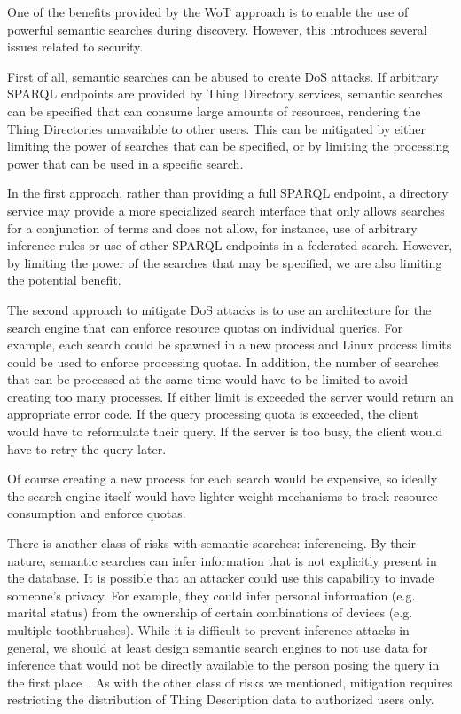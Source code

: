 One of the benefits provided by the WoT approach is to
enable the use of powerful semantic searches during discovery.
However, this introduces several issues related to security.

First of all, semantic searches can be abused to create DoS attacks.
If arbitrary SPARQL endpoints are provided by Thing Directory
services, semantic searches can be specified
that can consume large amounts of resources,
rendering the Thing Directories unavailable to other users.
This can be mitigated by either limiting the power of searches
that can be specified, or by limiting the processing
power that can be used in a specific search.

In the first approach, rather than providing a full
SPARQL endpoint, a directory service may provide a more specialized
search interface that only allows searches for a conjunction of terms
and does not allow, for instance, use of arbitrary inference rules
or use of other SPARQL endpoints in a federated search.
However, by limiting the power
of the searches that may be specified, we are also limiting the
potential benefit.

The second approach to mitigate DoS attacks 
is to use an architecture for the 
search engine that can enforce resource quotas on individual queries.
For example, each search could be spawned in a new process and Linux
process limits could be used to enforce processing quotas. In addition,
the number of searches that can be processed at the same time would
have to be limited to avoid creating too many processes.
If either limit is exceeded the server would return an appropriate
error code.  If the query processing quota is exceeded, the client
would have to reformulate their query.  If the server is too busy,
the client would have to retry the query later.

Of course creating a new process for each search would be expensive,
so ideally the search engine itself would have lighter-weight
mechanisms to track resource consumption and enforce quotas.

There is another class of risks with semantic searches: 
inferencing. 
By their nature, semantic searches can infer information that is
not explicitly present in the database.
It is possible that an attacker could use this capability
to invade someone's privacy.  For example, they could infer
personal information (e.g. marital status) from the ownership
of certain combinations of devices (e.g. multiple toothbrushes).
While it is difficult to prevent inference attacks in general,
we should at least design semantic search engines to not use 
data for inference that would not be directly available to the
person posing the query in the first place~\cite{Thura2005a,Xia2014a}.  
As with the other class of risks we mentioned,
mitigation requires restricting the distribution of Thing Description
data to authorized users only.
